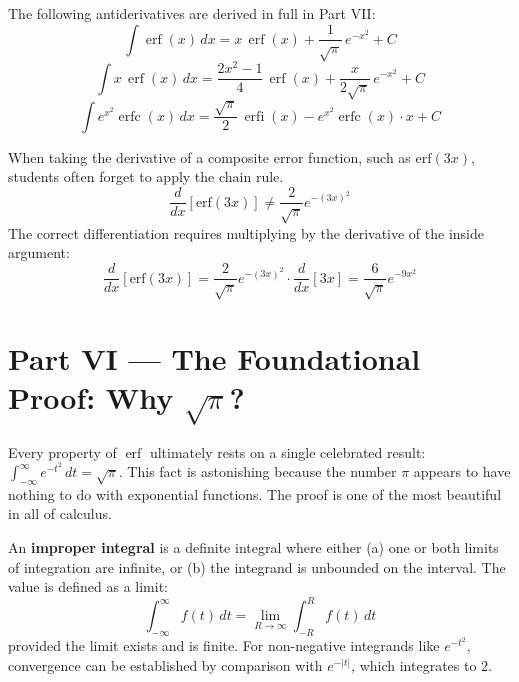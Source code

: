 \documentclass[11pt]{article}
\begin{document}
\begin{theorembox}
The following antiderivatives are derived in full in Part VII:
\[
\int \operatorname{erf}(x)\,dx = x\,\operatorname{erf}(x) + \frac{1}{\sqrt{\pi}}\,e^{-x^2} + C
\]
\[
\int x\,\operatorname{erf}(x)\,dx = \frac{2x^2 - 1}{4}\,\operatorname{erf}(x) + \frac{x}{2\sqrt{\pi}}\,e^{-x^2} + C
\]
\[
\int e^{x^2}\operatorname{erfc}(x)\,dx = \frac{\sqrt{\pi}}{2}\,\operatorname{erfi}(x) - e^{x^2}\operatorname{erfc}(x)\cdot x + C
\]
\end{theorembox}

\begin{warningbox}
When taking the derivative of a composite error function, such as $\text{erf}(3x)$, students often forget to apply the chain rule.
\[ \frac{d}{dx}[\text{erf}(3x)] \neq \frac{2}{\sqrt{\pi}} e^{-(3x)^2} \]
The correct differentiation requires multiplying by the derivative of the inside argument:
\[ \frac{d}{dx}[\text{erf}(3x)] = \frac{2}{\sqrt{\pi}} e^{-(3x)^2} \cdot \frac{d}{dx}[3x] = \frac{6}{\sqrt{\pi}} e^{-9x^2} \]
\end{warningbox}

\clearpage
{}
{}
\section*{Part VI --- The Foundational Proof: Why $\sqrt{\pi}$?}
\setcounter{section}{6}

Every property of $\operatorname{erf}$ ultimately rests on a single celebrated result: $\int_{-\infty}^{\infty} e^{-t^2}\,dt = \sqrt{\pi}$. This fact is astonishing because the number $\pi$ appears to have nothing to do with exponential functions. The proof is one of the most beautiful in all of calculus.

\begin{defnbox}
An \textbf{improper integral} is a definite integral where either (a) one or both limits of integration are infinite, or (b) the integrand is unbounded on the interval. The value is defined as a limit:
\[
\int_{-\infty}^{\infty} f(t)\,dt = \lim_{R\to\infty}\int_{-R}^{R} f(t)\,dt
\]
provided the limit exists and is finite. For non-negative integrands like $e^{-t^2}$, convergence can be established by comparison with $e^{-|t|}$, which integrates to $2$.
\end{defnbox}
\end{document}
